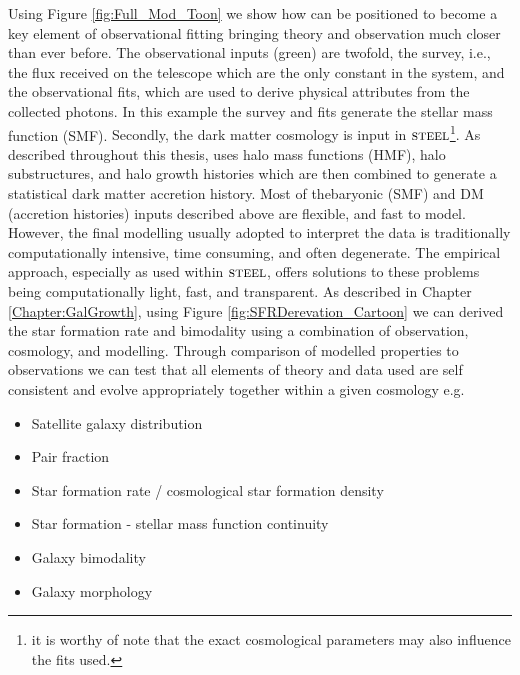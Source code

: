 Using Figure \ref{fig:Full_Mod_Toon} we show how \steel can be positioned to become a key element of observational fitting bringing theory and observation much closer than ever before. \textcolor{MPLgreen}{The observational inputs (green) are twofold, the survey, i.e., the flux received on the telescope which are the only constant in the system, and the observational fits, which are used to derive physical attributes from the collected photons. In this example the survey and fits generate the stellar mass function (SMF).} \textcolor{MPLred}{Secondly, the dark matter cosmology is input in $\textsc{steel}$\footnote{it is worthy of note that the exact cosmological parameters may also influence the fits used.}. As described throughout this thesis, \steel uses halo mass functions (HMF), halo substructures, and halo growth histories which are then combined to generate a statistical dark matter accretion history.} Most of thebaryonic (SMF) and DM (accretion histories) inputs described above are flexible, and fast to model. \textcolor{MPLblue}{However, the final modelling usually adopted to interpret the data is traditionally computationally intensive, time consuming, and often degenerate. The empirical approach, especially as used within $\textsc{steel}$, offers solutions to these problems being computationally light, fast, and transparent.} As described in Chapter \ref{Chapter:GalGrowth}, using Figure \ref{fig:SFRDerevation_Cartoon} we can derived the star formation rate and bimodality using a combination of \textcolor{MPLgreen}{observation}, \textcolor{MPLred}{cosmology}, and \textcolor{MPLblue}{modelling}. Through comparison of modelled properties to observations we can test that all elements of theory and data used are self consistent and evolve appropriately together within a given cosmology e.g.
\begin{itemize}
    \item Satellite galaxy distribution
    \item Pair fraction
    \item Star formation rate / cosmological star formation density
    \item Star formation - stellar mass function continuity
    \item Galaxy bimodality
    \item Galaxy morphology
\end{itemize}
